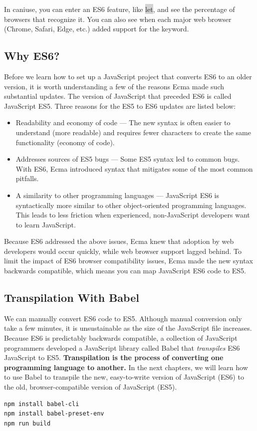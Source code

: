 \documentclass[11pt]{article}
\begin{document}
In caniuse, you can enter an ES6 feature, like \colorbox{lightgray}{let}, and see the percentage of browsers that recognize it. You can also see when each major web browser (Chrome, Safari, Edge, etc.) added support for the keyword.



\subsection{Why ES6?}
Before we learn how to set up a JavaScript project that converts ES6 to an older version, it is worth understanding a few of the reasons Ecma made such substantial updates. The version of JavaScript that preceded ES6 is called JavaScript ES5. Three reasons for the ES5 to ES6 updates are listed below: 
\begin{itemize}[leftmargin = *]
\item Readability and economy of code — The new syntax is often easier to understand (more readable) and requires fewer characters to create the same functionality (economy of code).
\item Addresses sources of ES5 bugs — Some ES5 syntax led to common bugs. With ES6, Ecma introduced syntax that mitigates some of the most common pitfalls.
\item A similarity to other programming languages — JavaScript ES6 is syntactically more similar to other object-oriented programming languages. This leads to less friction when experienced, non-JavaScript developers want to learn JavaScript.
\end{itemize}
Because ES6 addressed the above issues, Ecma knew that adoption by web developers would occur quickly, while web browser support lagged behind. To limit the impact of ES6 browser compatibility issues, Ecma made the new syntax backwards compatible, which means you can map JavaScript ES6 code to ES5.

\subsection{Transpilation With Babel}
We can manually convert ES6 code to ES5. Although manual conversion only take a few minutes, it is unsustainable as the size of the JavaScript file increases. Because ES6 is predictably backwards compatible, a collection of JavaScript programmers developed a JavaScript library called Babel that \textit{transpiles} ES6 JavaScript to ES5. \textbf{Transpilation is the process of converting one programming language to another.} In the next chapters, we will learn how to use Babel to transpile the new, easy-to-write version of JavaScript (ES6) to the old, browser-compatible version of JavaScript (ES5).
\begin{lstlisting}[basicstyle=\small\ttfamily\color{theWhite}, backgroundcolor = \color{theBlack}, language = Comment]
npm install babel-cli
npm install babel-preset-env
npm run build
\end{lstlisting}
\end{document}
